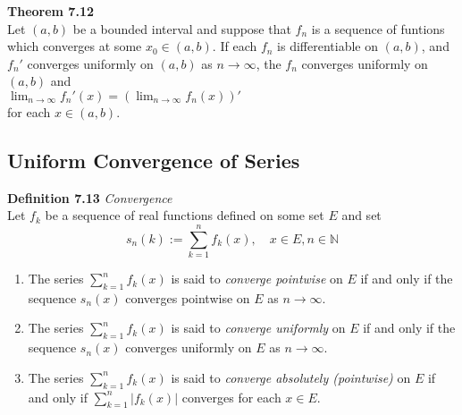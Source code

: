 \documentclass[8pt,landscape]{article}
\begin{document}
\begin{multicols}{3}
\textbf{Theorem 7.12} \\
Let $(a, b)$ be a bounded interval and suppose that $f_n$ is a sequence of funtions
which converges at some $x_0 \in (a, b)$.
If each $f_n$ is differentiable on $(a, b)$, and $f_n'$ converges uniformly on
$(a, b)$ as $n \to \infty$, the $f_n$ converges uniformly on $(a, b)$ and \\
$\lim_{n \to \infty} f_n'(x) = \left( \lim_{n \to \infty} f_n(x) \right)'$ \\
for each $x \in (a, b)$.

\subsection{Uniform Convergence of Series}

\textbf{Definition 7.13} \emph{Convergence} \\
Let $f_k$ be a sequence of real functions defined on some set $E$ and set
\[
    s_n(k) := \sum_{k=1}^n f_k(x), \quad x \in E, n \in \mathbb{N}
\]
\begin{enumerate}
    \item The series $\sum_{k=1}^n f_k(x)$ is said to \emph{converge pointwise} on $E$
        if and only if the sequence $s_n(x)$ converges pointwise on $E$ as
        $n \to \infty$.
    \item The series $\sum_{k=1}^n f_k(x)$ is said to \emph{converge uniformly} on $E$
        if and only if the sequence $s_n(x)$ converges uniformly on $E$ as
        $n \to \infty$.
    \item The series $\sum_{k=1}^n f_k(x)$ is said to
        \emph{converge absolutely (pointwise)} on $E$ if and only if
        $\sum_{k=1}^n |f_k(x)|$ converges for each $x \in E$.
\end{enumerate}


\end{multicols}
\end{document}
